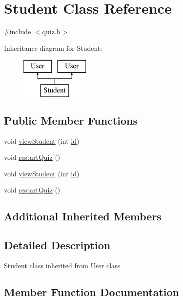 \hypertarget{class_student}{}\section{Student Class Reference}
\label{class_student}


{\ttfamily \#include $<$quiz.\+h$>$}

Inheritance diagram for Student\+:\begin{figure}[H]
\begin{center}
\leavevmode
\includegraphics[height=2.000000cm]{class_student}
\end{center}
\end{figure}
\subsection*{Public Member Functions}
\begin{DoxyCompactItemize}
\item 
void \hyperlink{class_student_a11dc036cf5e771abf9ff855952a32f4a}{view\+Student} (int \hyperlink{class_user_aa7e6e39b43020bbe9c3a196b3689b0f7}{id})
\item 
void \hyperlink{class_student_a466ca7dba4ff1ec96455157de6e49ebf}{restart\+Quiz} ()
\item 
void \hyperlink{class_student_a11dc036cf5e771abf9ff855952a32f4a}{view\+Student} (int \hyperlink{class_user_aa7e6e39b43020bbe9c3a196b3689b0f7}{id})
\item 
void \hyperlink{class_student_a466ca7dba4ff1ec96455157de6e49ebf}{restart\+Quiz} ()
\end{DoxyCompactItemize}
\subsection*{Additional Inherited Members}


\subsection{Detailed Description}
\hyperlink{class_student}{Student} class inherited from \hyperlink{class_user}{User} class 

\subsection{Member Function Documentation}
\hypertarget{class_student_a466ca7dba4ff1ec96455157de6e49ebf}{}
